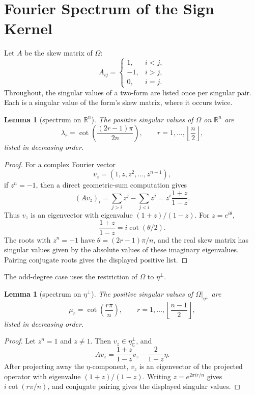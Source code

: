 \documentclass[11pt]{article}
\newtheorem{lemma}[theorem]{Lemma}
\newcommand{\R}{\mathbb{R}}
\newcommand{\C}{\mathbb{C}}
\begin{document}
\section{Fourier Spectrum of the Sign Kernel}\label{sec:fourier}

Let \(A\) be the skew matrix of \(\Omega\):
\[
  A_{ij}=
  \begin{cases}
    1, & i<j,\\
   -1, & i>j,\\
    0, & i=j.
  \end{cases}
\]
Throughout, the singular values of a two-form are listed once per singular pair.  Each is a
singular value of the form's skew matrix, where it occurs twice.

\begin{lemma}[spectrum on \(\R^n\)]
\label{lem:spectrum-rn}
The positive singular values of \(\Omega\) on \(\R^n\) are
\[
  \lambda_r=\cot\!\left(\frac{(2r-1)\pi}{2n}\right),
  \qquad
  r=1,\ldots,\left\lfloor\frac n2\right\rfloor,
\]
listed in decreasing order.
\end{lemma}

\begin{proof}
For a complex Fourier vector
\[
  v_z=(1,z,z^2,\ldots,z^{n-1}),
\]
if \(z^n=-1\), then a direct geometric-sum computation gives
\[
  (A v_z)_i
  =
  \sum_{j>i}z^j-\sum_{j<i}z^j
  =
  z^i\frac{1+z}{1-z}.
\]
Thus \(v_z\) is an eigenvector with eigenvalue \((1+z)/(1-z)\).  For
\(z=e^{i\theta}\),
\[
  \frac{1+z}{1-z}=i\cot(\theta/2).
\]
The roots with \(z^n=-1\) have \(\theta=(2r-1)\pi/n\), and the real skew
matrix has singular values given by the absolute values of these imaginary
eigenvalues.  Pairing conjugate roots gives the displayed positive list.
\end{proof}

The odd-degree case uses the restriction of \(\Omega\) to
\(\eta^\perp\).

\begin{lemma}[spectrum on \(\eta^\perp\)]
\label{lem:spectrum-eta-perp}
The positive singular values of \(\Omega|_{\eta^\perp}\) are
\[
  \mu_r=\cot\!\left(\frac{r\pi}{n}\right),
  \qquad
  r=1,\ldots,\left\lfloor\frac{n-1}{2}\right\rfloor,
\]
listed in decreasing order.
\end{lemma}

\begin{proof}
Let \(z^n=1\) and \(z\neq 1\).  Then \(v_z\in\eta^\perp_\C\), and
\[
  A v_z
  =
  \frac{1+z}{1-z}v_z-\frac{2}{1-z}\eta.
\]
After projecting away the \(\eta\)-component, \(v_z\) is an eigenvector of
the projected operator with eigenvalue \((1+z)/(1-z)\).  Writing
\(z=e^{2\pi i r/n}\) gives \(i\cot(r\pi/n)\), and conjugate pairing gives
the displayed singular values.
\end{proof}
\end{document}

